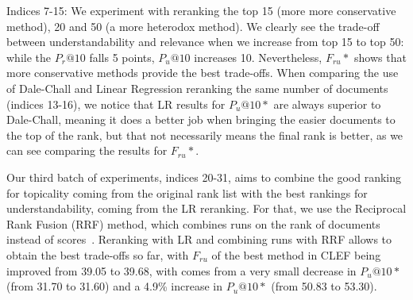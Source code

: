 Indices 7-15:
We experiment with reranking the top 15 (more more conservative method), 20 and 50 (a more heterodox method). We clearly see the trade-off between understandability and relevance when we increase from top 15 to top 50: while the $P_r@10$ falls 5 points, $P_u@10$ increases 10. Nevertheless, $F_{ru}*$ shows that more conservative methods provide the best trade-offs.
When comparing the use of Dale-Chall and Linear Regression reranking the same number of documents (indices 13-16), we notice that LR results for $P_u@10*$ are always superior to Dale-Chall, meaning it does a better job when bringing the easier documents to the top of the rank, but that not necessarily means the final rank is better, as we can see comparing the results for $F_{ru}*$.

Our third batch of experiments, indices 20-31, aims to combine the good ranking for topicality coming from the original rank list with the best rankings for understandability, coming from the LR reranking.
For that, we use the Reciprocal Rank Fusion (RRF) method, which combines runs on the rank of documents instead of scores~\cite{cormack09}. Reranking with LR and combining runs with RRF allows to obtain the best trade-offs so far, with $F_{ru}$ of the best method in CLEF being improved from 39.05 to 39.68, with comes from a very small decrease in $P_u@10*$ (from 31.70 to 31.60) and a 4.9\% increase in $P_u@10*$ (from 50.83 to 53.30).

